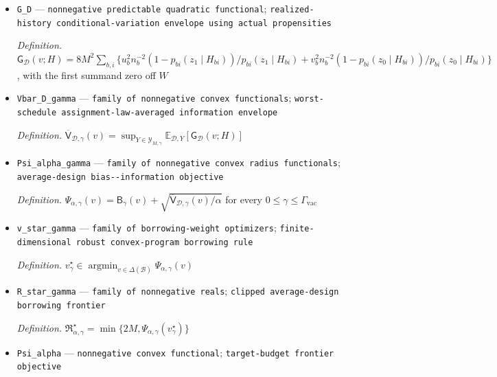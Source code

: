 \documentclass{article}
\begin{document}
\begin{itemize}
  \par\smallskip\noindent\emph{Definition.} \(\mathsf B_\Gamma(v)=\mathsf B_\gamma(v)|_{\gamma=\Gamma}\)
  \item \texttt{G\_\allowbreak{}D} --- \texttt{nonnegative predictable quadratic functional}; \texttt{realized-\allowbreak{}history conditional-\allowbreak{}variation envelope using actual propensities}
  \par\smallskip\noindent\emph{Definition.} \(\mathsf G_{\mathcal D}(v;H)=8M^2\sum_{b,i}\{u_b^2 n_b^{-2}(1-p_{bi}(z_1\mid H_{bi}))/p_{bi}(z_1\mid H_{bi})+v_b^2 n_b^{-2}(1-p_{bi}(z_0\mid H_{bi}))/p_{bi}(z_0\mid H_{bi})\}\), with the first summand zero off \(W\)
  \item \texttt{Vbar\_\allowbreak{}D\_\allowbreak{}gamma} --- \texttt{family of nonnegative convex functionals}; \texttt{worst-\allowbreak{}schedule assignment-\allowbreak{}law-\allowbreak{}averaged information envelope}
  \par\smallskip\noindent\emph{Definition.} \(\overline{\mathsf V}_{\mathcal D,\gamma}(v)=\sup_{Y\in\mathcal Y_{M,\gamma}}\mathbb E_{\mathcal D,Y}[\mathsf G_{\mathcal D}(v;H)]\)
  \item \texttt{Psi\_\allowbreak{}alpha\_\allowbreak{}gamma} --- \texttt{family of nonnegative convex radius functionals}; \texttt{average-\allowbreak{}design bias-\allowbreak{}-\allowbreak{}information objective}
  \par\smallskip\noindent\emph{Definition.} \(\Psi_{\alpha,\gamma}(v)=\mathsf B_\gamma(v)+\sqrt{\overline{\mathsf V}_{\mathcal D,\gamma}(v)/\alpha}\) for every \(0\le\gamma\le\Gamma_{\mathrm{vac}}\)
  \item \texttt{v\_\allowbreak{}star\_\allowbreak{}gamma} --- \texttt{family of borrowing-\allowbreak{}weight optimizers}; \texttt{finite-\allowbreak{}dimensional robust convex-\allowbreak{}program borrowing rule}
  \par\smallskip\noindent\emph{Definition.} \(v_\gamma^\star\in\operatorname*{argmin}_{v\in\Delta(\mathcal B)}\Psi_{\alpha,\gamma}(v)\)
  \item \texttt{R\_\allowbreak{}star\_\allowbreak{}gamma} --- \texttt{family of nonnegative reals}; \texttt{clipped average-\allowbreak{}design borrowing frontier}
  \par\smallskip\noindent\emph{Definition.} \(\mathfrak R_{\alpha,\gamma}^\star=\min\{2M,\Psi_{\alpha,\gamma}(v_\gamma^\star)\}\)
  \item \texttt{Psi\_\allowbreak{}alpha} --- \texttt{nonnegative convex functional}; \texttt{target-\allowbreak{}budget frontier objective}

\end{itemize}
\end{document}
